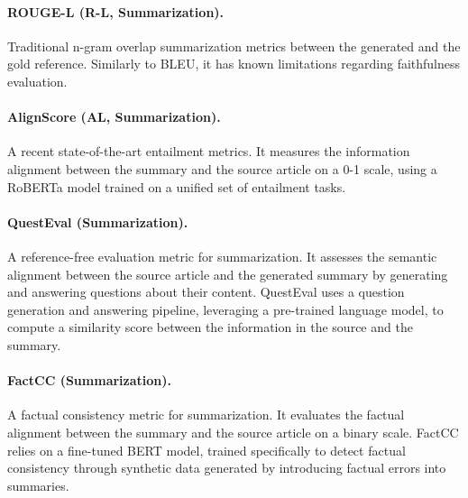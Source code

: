 \paragraph{ROUGE-L (R-L, Summarization).} \citep{lin-2004-rouge} Traditional n-gram overlap summarization metrics between the generated and the gold reference. Similarly to BLEU, it has known limitations \citep{fabbri-etal-2021-summeval} regarding faithfulness evaluation.

\paragraph{AlignScore (AL,  Summarization).} \citep{alignscore} A recent state-of-the-art entailment metrics. It measures the information alignment between the summary and the source article on a 0-1 scale, using a RoBERTa model \citep{roberta} trained on a unified set of entailment tasks.

\paragraph{QuestEval (Summarization).} \citep{scialom-etal-2021-questeval} A reference-free evaluation metric for summarization. It assesses the semantic alignment between the source article and the generated summary by generating and answering questions about their content. QuestEval uses a question generation and answering pipeline, leveraging a pre-trained language model, to compute a similarity score between the information in the source and the summary.

\paragraph{FactCC (Summarization).} \citep{kryscinski-etal-2020-evaluating} A factual consistency metric for summarization. It evaluates the factual alignment between the summary and the source article on a binary scale. FactCC relies on a fine-tuned BERT model, trained specifically to detect factual consistency through synthetic data generated by introducing factual errors into summaries.

